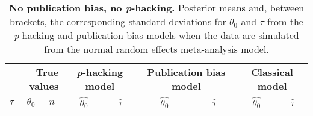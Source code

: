 \begin{table}[ht]
\centering
\caption{{\bf No publication bias, no 
                    \textit{p}-hacking.} Posterior means and, between brackets, the corresponding 
                    standard deviations for $\theta_0$ and $\tau$ from the \textit{p}-hacking 
                    and publication bias models when the data are simulated 
                    from the normal random effects meta-analysis model.} 
\label{tab:Simulation_classical}
\begin{tabular}{lllrrrrrr}
   \multicolumn{3}{r}{\textbf{True values}} & 
       \multicolumn{2}{c}{\textbf{\textit{p}-hacking model}} &
       \multicolumn{2}{c}{\textbf{Publication bias model}} &
       \multicolumn{2}{c}{\textbf{Classical model}}\\$\tau$ & $\theta_0$ & $n$ & \multicolumn{1}{c}{$\widehat{\theta_0}$} & \multicolumn{1}{c}{$\widehat{\tau}$} & \multicolumn{1}{c}{$\widehat{\theta_0}$} & \multicolumn{1}{c}{$\widehat{\tau}$} & \multicolumn{1}{c}{$\widehat{\theta_0}$} & \multicolumn{1}{c}{$\widehat{\tau}$} \\ 
   \hline


\end{tabular}
\end{table}
